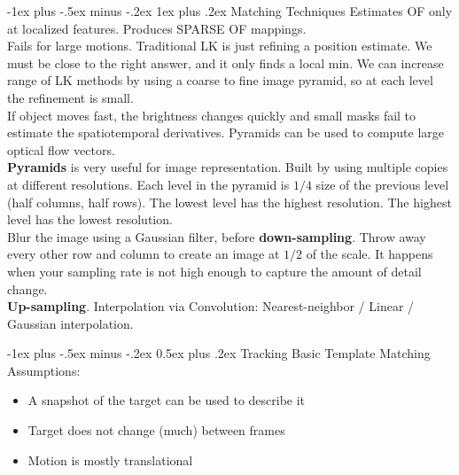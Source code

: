 \documentclass[10pt,landscape]{article}
\makeatletter
\renewcommand{\section}{\@startsection{section}{1}{0mm}%
                                {-1ex plus -.5ex minus -.2ex}%
                                {0.5ex plus .2ex}%
                                {\normalfont\large\bfseries}}
\renewcommand{\subsubsection}{\@startsection{subsubsection}{3}{0mm}%
                                {-1ex plus -.5ex minus -.2ex}%
                                {1ex plus .2ex}%
                                {\normalfont\small\bfseries}}
\makeatother
\begin{document}
\begin{multicols}{3}
\subsubsection{Matching Techniques}
Estimates OF only at localized features. Produces SPARSE OF mappings.\\
Fails for large motions. Traditional LK is just refining a position estimate. We must be close to the right answer, and it only finds a local min. We can increase range of LK methods by using a coarse to fine image pyramid, so at each level the refinement is small. \\
If object moves fast, the brightness changes quickly and small masks fail to estimate the spatiotemporal derivatives. Pyramids can be used to compute large optical flow vectors.\\
\textbf{Pyramids} is very useful for image representation. Built by using multiple copies at different resolutions. Each level in the pyramid is $1/4$ size of the previous level (half columns, half rows). The lowest level has the highest resolution. The highest level has the lowest resolution.\\
Blur the image using a Gaussian filter, before \textbf{down-sampling}. Throw away every other row and column to create an image at $1/2$ of the scale. It happens when your sampling rate is not high enough to capture the amount of detail change.\\
\textbf{Up-sampling}. Interpolation via Convolution: Nearest-neighbor / Linear / Gaussian interpolation.



\section{Tracking}
Basic Template Matching Assumptions:
\begin{itemize}
    \item A snapshot of the target can be used to describe it
    \item Target does not change (much) between frames
    \item Motion is mostly translational
\end{itemize}


\end{multicols}
\end{document}

